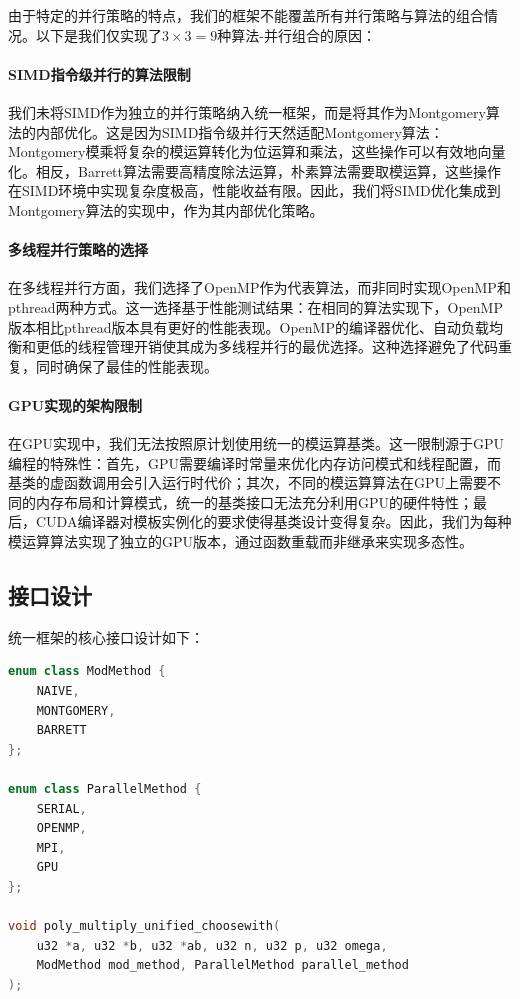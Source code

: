 \documentclass[a4paper]{article}
\begin{document}
由于特定的并行策略的特点，我们的框架不能覆盖所有并行策略与算法的组合情况。以下是我们仅实现了$3 \times 3 = 9$种算法-并行组合的原因：

\paragraph{SIMD指令级并行的算法限制} 我们未将SIMD作为独立的并行策略纳入统一框架，而是将其作为Montgomery算法的内部优化。这是因为SIMD指令级并行天然适配Montgomery算法：Montgomery模乘将复杂的模运算转化为位运算和乘法，这些操作可以有效地向量化。相反，Barrett算法需要高精度除法运算，朴素算法需要取模运算，这些操作在SIMD环境中实现复杂度极高，性能收益有限。因此，我们将SIMD优化集成到Montgomery算法的实现中，作为其内部优化策略。

\paragraph{多线程并行策略的选择} 在多线程并行方面，我们选择了OpenMP作为代表算法，而非同时实现OpenMP和pthread两种方式。这一选择基于性能测试结果：在相同的算法实现下，OpenMP版本相比pthread版本具有更好的性能表现。OpenMP的编译器优化、自动负载均衡和更低的线程管理开销使其成为多线程并行的最优选择。这种选择避免了代码重复，同时确保了最佳的性能表现。

\paragraph{GPU实现的架构限制} 在GPU实现中，我们无法按照原计划使用统一的模运算基类。这一限制源于GPU编程的特殊性：首先，GPU需要编译时常量来优化内存访问模式和线程配置，而基类的虚函数调用会引入运行时代价；其次，不同的模运算算法在GPU上需要不同的内存布局和计算模式，统一的基类接口无法充分利用GPU的硬件特性；最后，CUDA编译器对模板实例化的要求使得基类设计变得复杂。因此，我们为每种模运算算法实现了独立的GPU版本，通过函数重载而非继承来实现多态性。

\subsection{接口设计}

统一框架的核心接口设计如下：

\begin{lstlisting}[language=C++]
enum class ModMethod {
    NAIVE,
    MONTGOMERY, 
    BARRETT
};

enum class ParallelMethod {
    SERIAL,
    OPENMP,
    MPI,
    GPU
};

void poly_multiply_unified_choosewith(
    u32 *a, u32 *b, u32 *ab, u32 n, u32 p, u32 omega,
    ModMethod mod_method, ParallelMethod parallel_method
);
\end{lstlisting}
\end{document}

